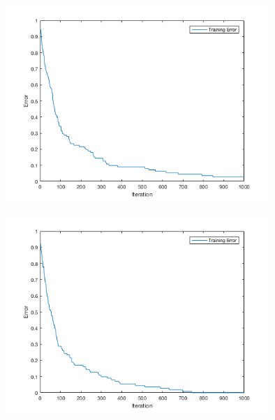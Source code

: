 \documentclass[12pt]{article}
\begin{document}


\begin{center}
  \begin{table}[H]
    \begin{varwidth}[b]{0.4\linewidth}
      \centering
      \label{table:NYYYN}
    \end{varwidth}%
    \hfill
    \begin{minipage}[b]{0.6\linewidth}
      \centering
      \includegraphics[width=100mm]{NYYYN_training_error.png}
      \label{fig:NYYYN}
    \end{minipage}
  \end{table}
\end{center}




\begin{center}
  \begin{table}[H]
    \begin{varwidth}[b]{0.4\linewidth}
      \centering
      \label{table:YYYYN}
    \end{varwidth}%
    \hfill
    \begin{minipage}[b]{0.6\linewidth}
      \centering
      \includegraphics[width=100mm]{YYYYN_training_error.png}
      \label{fig:YYYYN}
    \end{minipage}
  \end{table}
\end{center}
\end{document}
